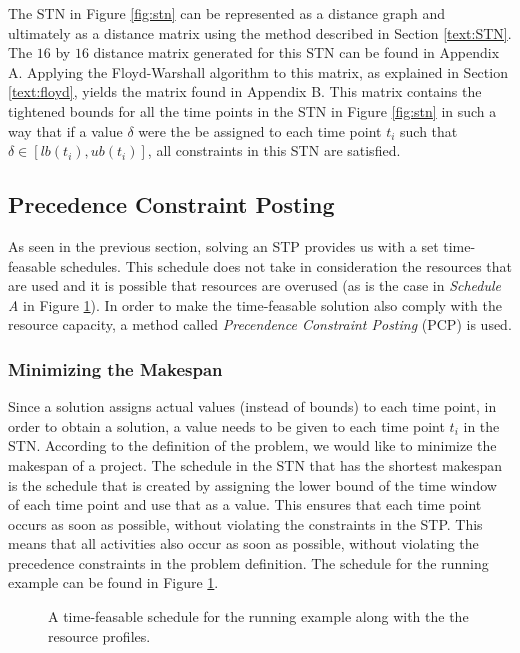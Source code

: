 \documentclass{article}
\theoremstyle{definition}
\newcommand{\inputtikz}[1]{}
\begin{document}
The STN in Figure \ref{fig:stn} can be represented as a distance graph and ultimately as a distance matrix using the method described in Section \ref{text:STN}. The $16$ by $16$ distance matrix generated for this STN can be found in Appendix A. Applying the Floyd-Warshall algorithm to this matrix, as explained in Section \ref{text:floyd}, yields the matrix found in Appendix B. This matrix contains the tightened bounds for all the time points in the STN in Figure \ref{fig:stn} in such a way that if a value $\delta$ were the be assigned to each time point $t_i$ such that $\delta \in [lb(t_i), ub(t_i)]$, all constraints in this STN are satisfied.

\subsection{Precedence Constraint Posting}
\label{text:PCP}
As seen in the previous section, solving an STP provides us with a set time-feasable schedules. 
This schedule does not take in consideration the resources that are used and it is possible that resources are overused (as is the case in \emph{Schedule A} in Figure \ref{fig:resource_graph}). 
In order to make the time-feasable solution also comply with the resource capacity, a method called \emph{Precendence Constraint Posting} (PCP) \cite{policella07} is used. 

\subsubsection{Minimizing the Makespan}
Since a solution assigns actual values (instead of bounds) to each time point, in order to obtain a solution, a value needs to be given to each time point $t_i$ in the STN. According to the definition of the problem, we would like to minimize the makespan of a project. The schedule in the STN that has the shortest makespan is the schedule that is created by assigning the lower bound of the time window of each time point and use that as a value. This ensures that each time point occurs as soon as possible, without violating the constraints in the STP. This means that all activities also occur as soon as possible, without violating the precedence constraints in the problem definition. The schedule for the running example can be found in Figure \ref{fig:resource_graph}.

\begin{figure}[h]
	\centering
	\inputtikz{schedule_infeasible_profile}
	\caption{A time-feasable schedule for the running example along with the the resource profiles.}
	\label{fig:resource_graph}
\end{figure}
\end{document}
